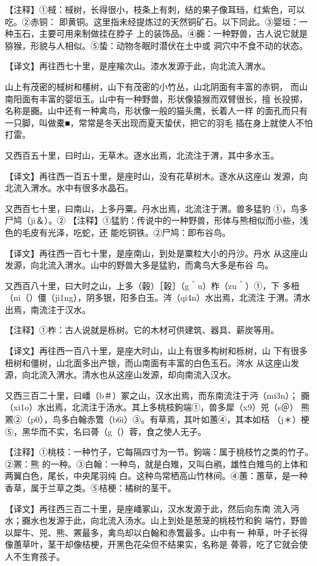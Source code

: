 \documentclass[a4paper,12pt,UTF8,twoside]{ctexbook}
\begin{document}
【注释】①棫：棫树，长得很小，枝条上有刺，结的果子像耳珰，红紫色，可以吃。②赤铜： 即黄铜。这里指未经提炼过的天然铜矿石。以下同此。③婴垣：一种玉石，主要可用来制做挂在脖子 上的装饰品。④嚻：一种野兽，古人说它就是猕猴，形貌与人相似。⑤蛰：动物冬眠时潜伏在土中或 洞穴中不食不动的状态。

【译文】再往西七十里，是座羭次山。漆水发源于此，向北流入渭水。

山上有茂密的棫树和橿树，山下有茂密的小竹丛，山北阴面有丰富的赤铜， 而山南阳面有丰富的婴垣玉。山中有一种野兽，形状像猿猴而双臂很长，擅 长投掷，名称是嚻。山中还有一种禽鸟，形状像一般的猫头鹰，长着人一样 的面孔而只有一只脚，叫做橐■，常常是冬天出现而夏天蛰伏，把它的羽毛 插在身上就使人不怕打雷。

又西百五十里，曰时山，无草木。逐水出焉，北流注于渭，其中多水玉。

【译文】再往西一百五十里，是座时山，没有花草树木。逐水从这座山 发源，向北流入渭水。水中有很多水晶石。

又西百七十里，曰南山，上多丹粟。丹水出焉，北流注于渭。兽多猛豹 ①，鸟多尸鸠（ji＆）。② 【注释】①猛豹：传说中的一种野兽，形体与熊相似而小些，浅色的毛皮有光泽，吃蛇，还 能吃铜铁。②尸鸠：即布谷鸟。

【译文】再往西一百七十里，是座南山，到处是粟粒大小的丹沙。丹水 从这座山发源，向北流入渭水。山中的野兽大多是猛豹，而禽鸟大多是布谷 鸟。

又西百八十里，曰大时之山，上多（穀）［榖］（g＾u）柞（zu＾）①，下 多杻（ni（）僵（ji1ng），阴多银，阳多白玉。涔（qi4n）水出焉，北流注 于渭。清水出焉，南流注于汉水。

【注释】①柞：古人说就是栎树。它的木材可供建筑、器具、薪炭等用。

【译文】再往西一百八十里，是座大时山，山上有很多构树和栎树，山 下有很多杻树和僵树，山北面多出产银，而山南面有丰富的白色玉石。涔水 从这座山发源，向北流入渭水。清水也从这座山发源，却向南流入汉水。

又西三百二十里，曰嶓（b＃）冢之山，汉水出焉，而东南流注于沔（mi3n）； 嚻（xi1o）水出焉，北流注于汤水。其上多桃枝鉤端①，兽多犀（x9）兕（s＠） 熊罴②（p0），鸟多白翰赤鷩（b6i）③。有草焉，其叶如蕙④，其本如桔 （j＊）梗⑤，黑华而不实，名曰蓇（g（）蓉，食之使人无子。

【注释】①桃枝：一种竹子，它每隔四寸为一节。鉤端：属于桃枝竹之类的竹子。②罴：熊 的一种。③白翰：一种鸟，就是白雉，又叫白鹇，雄性白雉鸟的上体和两翼白色，尾长，中央尾羽纯 白。这种鸟常栖高山竹林间。④蕙：蕙草，是一种香草，属于兰草之类。⑤桔梗：橘树的茎干。

【译文】再往西三百二十里，是座嶓冢山，汉水发源于此，然后向东南 流入沔水；嚻水也发源于此，向北流入汤水。山上到处是葱茏的桃枝竹和鉤 端竹，野兽以犀牛、兕、熊、罴最多，禽鸟却以白翰和赤鷩最多。山中有一 种草，叶子长得像蕙草叶，茎干却像桔梗，开黑色花朵但不结果实，名称是 蓇蓉，吃了它就会使人不生育孩子。
\end{document}
